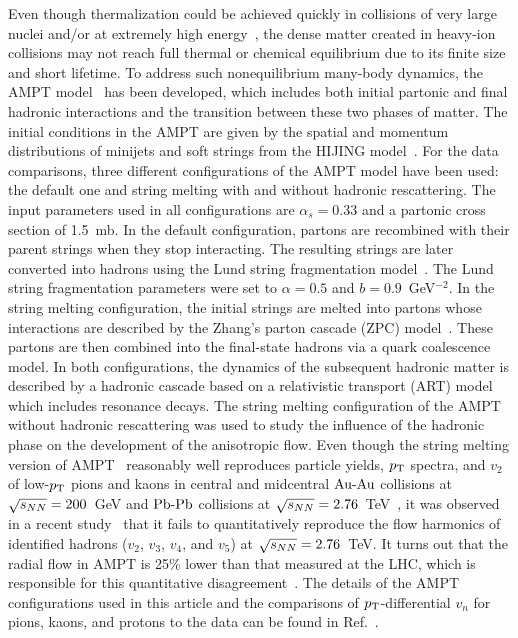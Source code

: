 Even though thermalization could be achieved quickly in collisions of very large nuclei and/or at extremely high energy~\cite{Kurkela:2015qoa}, the dense matter created in heavy-ion collisions may not reach full thermal or chemical equilibrium due to its finite size and short lifetime. To address such nonequilibrium many-body dynamics, the AMPT model~\cite{Zhang:1999bd,Lin:2000cx,Lin:2004en} has been developed, which includes both initial partonic and final hadronic interactions and the transition between these two phases of matter.
The initial conditions in the AMPT are given by the spatial and momentum distributions of minijets and soft strings from the HIJING model~\cite{Wang:1991hta,Gyulassy:1994ew}.
For the data comparisons, three different configurations of the AMPT model have been used: the default one and string melting with and without hadronic rescattering. The input parameters used in all configurations are $\alpha_s = 0.33$ and a partonic cross section of 1.5~mb.
In the default configuration, partons are recombined with their parent strings when they stop interacting. The resulting strings are later converted into hadrons using the Lund string fragmentation model~\cite{Andersson:1986gw,NilssonAlmqvist:1986rx}.
The Lund string fragmentation parameters were set to $\alpha = 0.5$ and $b = 0.9$~GeV$^{-2}$.
In the string melting configuration, the initial strings are melted into partons whose interactions are described by the Zhang's parton cascade (ZPC) model~\cite{Zhang:1997ej}. These partons are then combined into the final-state hadrons via a quark coalescence model. 
In both configurations, the dynamics of the subsequent hadronic matter is described by a hadronic cascade based on a relativistic transport (ART) model~\cite{Li:2001xh} which includes resonance decays.
The string melting configuration of the AMPT without hadronic rescattering was used to study the influence of the hadronic phase on the development of the anisotropic flow.
Even though the string melting version of AMPT~\cite{Lin:2001zk,Lin:2004en} reasonably well reproduces particle yields, $p_{\rm T}$ spectra, and $v_2$ of low-$p_{\rm T}$ pions and kaons in central and midcentral $\textnormal{Au-Au}$ collisions at $\sqrt{s_{NN}}=200$~GeV and $\textnormal{Pb-Pb}$ collisions at $\sqrt{s_{NN}}=2.76$~TeV~\cite{Lin:2014tya}, it was observed in a recent study~\cite{Adam:2016nfo} that it fails to quantitatively reproduce the flow harmonics of identified hadrons ($v_2$, $v_3$, $v_4$, and $v_5$) at $\sqrt{s_{NN}}=2.76$~TeV. It turns out that the radial flow in AMPT is 25\% lower than that measured at the LHC, which is responsible for this quantitative disagreement~\cite{Adam:2016nfo}. The details of the AMPT configurations used in this article and the comparisons of $p_{\rm T}$-differential $v_{n}$ for pions, kaons, and protons to the data can be found in Ref.~\cite{Adam:2016nfo}.

